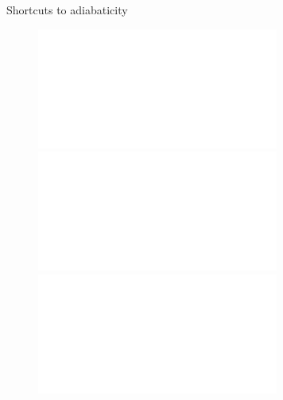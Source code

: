\documentclass{beamer}
\begin{document}
{
\begin{frame}

\end{frame}
}


{
\begin{frame}

\end{frame}
}

\begin{frame}{Shortcuts to adiabaticity}

  \begin{figure}
\includegraphics<1>[width=\textwidth]{analogy1.pdf}\includegraphics<2>[width=\textwidth]{analogy2.pdf}\includegraphics<3>[width=\textwidth]{analogy3.pdf}
  \end{figure}

\end{frame}
\end{document}
